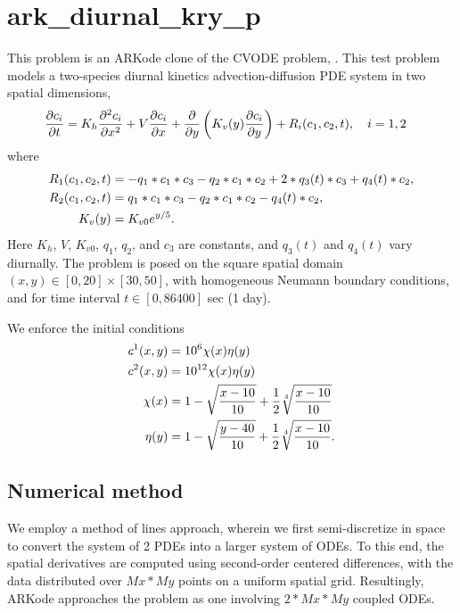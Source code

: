 \documentclass[letterpaper,10pt,english]{sphinxmanual}
\begin{document}
\section{ark\_diurnal\_kry\_p}
\label{c_parallel:id2}\label{c_parallel:ark-diurnal-kry-p}
This problem is an ARKode clone of the CVODE problem,
.  This test problem models a two-species
diurnal kinetics advection-diffusion PDE system in two spatial
dimensions,
\begin{gather}
\begin{split}\frac{\partial c_i}{\partial t} &=
  K_h \frac{\partial^2 c_i}{\partial x^2} +
  V \frac{\partial     c_i}{\partial x} +
  \frac{\partial}{\partial y}\left( K_v(y)
  \frac{\partial c_i}{\partial y}\right) +
  R_i(c_1,c_2,t),\quad i=1,2\end{split}\notag
\end{gather}
where
\begin{gather}
\begin{split}R_1(c_1,c_2,t) &= -q_1*c_1*c_3 - q_2*c_1*c_2 + 2*q_3(t)*c_3 + q_4(t)*c_2, \\
R_2(c_1,c_2,t) &=  q_1*c_1*c_3 - q_2*c_1*c_2 - q_4(t)*c_2, \\
K_v(y) &= K_{v0} e^{y/5}.\end{split}\notag
\end{gather}
Here \(K_h\), \(V\), \(K_{v0}\), \(q_1\), \(q_2\),
and \(c_3\) are constants, and \(q_3(t)\) and \(q_4(t)\)
vary diurnally.  The problem is posed on the square spatial domain
\((x,y) \in [0,20]\times[30,50]\), with homogeneous Neumann
boundary conditions, and for time interval \(t\in [0,86400]\) sec
(1 day).

We enforce the initial conditions
\begin{gather}
\begin{split}c^1(x,y) &=  10^6 \chi(x)\eta(y) \\
c^2(x,y) &=  10^{12} \chi(x)\eta(y) \\
\chi(x) &= 1 - \sqrt{\frac{x - 10}{10}} + \frac12 \sqrt[4]{\frac{x - 10}{10}} \\
\eta(y) &= 1 - \sqrt{\frac{y - 40}{10}} + \frac12 \sqrt[4]{\frac{x - 10}{10}}.\end{split}\notag
\end{gather}

\subsection{Numerical method}
\label{c_parallel:id3}
We employ a method of lines approach, wherein we first
semi-discretize in space to convert the system of 2 PDEs into a larger
system of ODEs.  To this end, the spatial derivatives are computed
using second-order centered differences, with the data distributed
over \(Mx*My\) points on a uniform spatial grid.  Resultingly, ARKode
approaches the problem as one involving \(2*Mx*My\) coupled ODEs.
\end{document}
